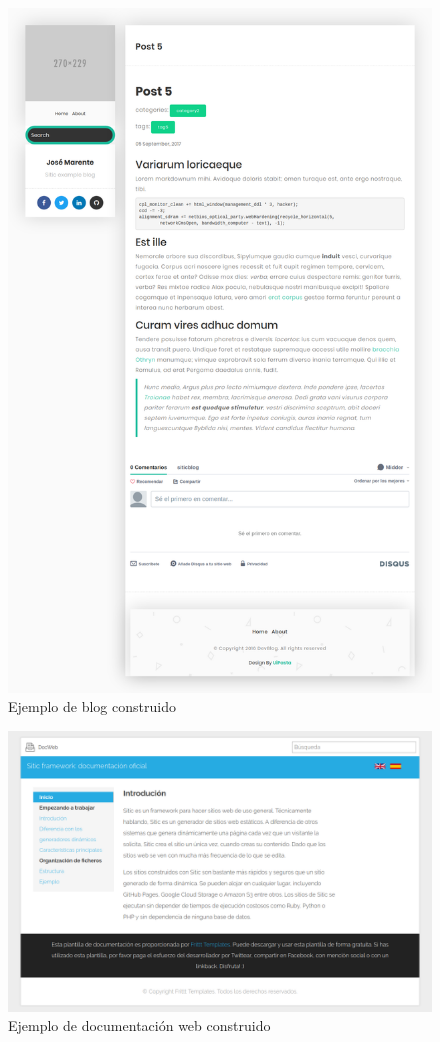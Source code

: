 \begin{figure}[htbp]
    \centering
    \includegraphics[width=1\textwidth]{7_pruebas/blog_example.png}
    \caption{Ejemplo de blog construido}
    \label{fig:blog-example}
\end{figure}

\begin{figure}[htbp]
    \centering
    \includegraphics[width=1.1\textwidth]{7_pruebas/doc_example.png}
    \caption{Ejemplo de documentación web construido}
    \label{fig:doc-example}
\end{figure}

